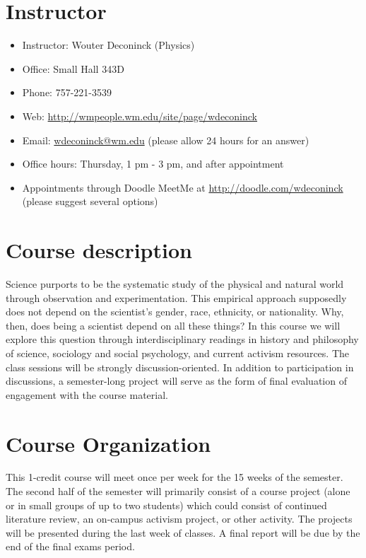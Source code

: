 \documentclass{article}
\begin{document}
\section{Instructor}
\begin{itemize}
\item Instructor: Wouter Deconinck (Physics)
\item Office: Small Hall 343D
\item Phone: 757-221-3539
\item Web: \url{http://wmpeople.wm.edu/site/page/wdeconinck}
\item Email: \href{mailto:wdeconinck@wm.edu}{wdeconinck@wm.edu} (please allow 24 hours for an answer)
\item Office hours: Thursday, 1 pm - 3 pm, and after appointment
\item Appointments through Doodle MeetMe at \url{http://doodle.com/wdeconinck} (please suggest several options)
\end{itemize}


\section{Course description}
Science purports to be the systematic study of the physical and natural world through observation and experimentation. This empirical approach supposedly does not depend on the scientist’s gender, race, ethnicity, or nationality. Why, then, does being a scientist depend on all these things? In this course we will explore this question through interdisciplinary readings in history and philosophy of science, sociology and social psychology, and current activism resources. The class sessions will be strongly discussion-oriented. In addition to participation in discussions, a semester-long project will serve as the form of final evaluation of engagement with the course material.

\section{Course Organization}
This 1-credit course will meet once per week for the 15 weeks of the semester. The second half of the semester will primarily consist of a course project (alone or in small groups of up to two students) which could consist of continued literature review, an on-campus activism project, or other activity. The projects will be presented during the last week of classes. A final report will be due by the end of the final exams period. 
\end{document}
